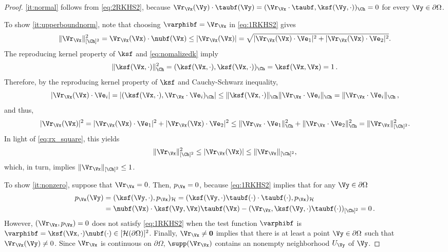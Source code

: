 \documentclass{siamart1116}
\numberwithin{theorem}{section}
\begin{document}
\begin{proof}
\cref{it:normal} follows from \cref{eq:2RKHS2}, because
$\Vr_\Vx (\Vy) \cdot \taubf(\Vy) = (\Vr_\Vx \cdot \taubf,\ksf(\Vy, \cdot))_\Ch = 0$ for every
$\Vy\in\partial\Omega$.

To show \cref{it:upperboundnorm}, note that choosing
$\varphibf = \Vr_\Vx$ in \cref{eq:1RKHS2} gives
\begin{equation}\label{eq:rx_square}
\|\Vr_\Vx\|_{[\Ch]^2}^2 = \Vr_\Vx(\Vx)\cdot \nubf(\Vx) \le |\Vr_\Vx(\Vx)| =
\sqrt{|\Vr_\Vx(\Vx)\cdot \Ve_1|^2 + |\Vr_\Vx(\Vx)\cdot \Ve_2|^2}.
\end{equation}
The reproducing kernel property of $\ksf$ and \cref{eq:nomalizedk} imply
\begin{equation}\label{eq:normkisone}
\|\ksf(\Vx,\cdot)\|_{\Ch}^2 = (\ksf(\Vx,\cdot), \ksf(\Vx,\cdot))_{\Ch} = \ksf(\Vx,\Vx) = 1\,.
\end{equation}
Therefore, by the reproducing kernel property of $\ksf$ and Cauchy-Schwarz inequality,
\begin{equation}\label{eq:rxCSineq}
|\Vr_\Vx(\Vx)\cdot \Ve_i| = |(\ksf(\Vx,\cdot),\Vr_\Vx\cdot \Ve_i)_{\Ch}| \le 
\|\ksf(\Vx,\cdot)\|_{\Ch} \|\Vr_\Vx\cdot \Ve_i\|_{\Ch} =  \|\Vr_\Vx\cdot \Ve_i\|_{\Ch}\,,
\end{equation}
and thus,
\begin{equation*} 
|\Vr_\Vx(\Vx)|^2 = |\Vr_\Vx(\Vx)\cdot \Ve_1|^2 + |\Vr_\Vx(\Vx)\cdot \Ve_2|^2
\leq  \|\Vr_\Vx\cdot \Ve_1\|_{\Ch}^2 +  \|\Vr_\Vx\cdot \Ve_2\|_{\Ch}^2 
=  \|\Vr_\Vx\|_{[\Ch]^2}^2.
\end{equation*}
In light of \cref{eq:rx_square}, this yields 
\begin{equation}\label{eq:in_light}
\begin{split}
\|\Vr_\Vx\|_{[\Ch]^2}^2   \le |\Vr_\Vx(\Vx)|
\le \|\Vr_\Vx\|_{[\Ch]^2},
\end{split}
\end{equation}
which, in turn, implies $\|\Vr_\Vx\|_{[\Ch]^2} \le 1$.

To show \cref{it:nonzero}, suppose that $\Vr_\Vx =0$. Then, $p_\Vx = 0$, because 
\cref{eq:1RKHS2} implies that for any $\Vy\in\partial\Omega$
\begin{align*}
p_\Vx(\Vy) &= (\ksf(\Vy,\cdot), p_\Vx )_{\mathcal H} 
= (\ksf(\Vy,\cdot)\taubf(\cdot) \cdot\taubf(\cdot), p_\Vx )_{\mathcal H}\\
&= \nubf(\Vx)\cdot \ksf(\Vy,\Vx)\taubf(\Vx) - (\Vr_\Vx, \ksf(\Vy,\cdot)\taubf(\cdot))_{[\Ch]^2} = 0\,.
\end{align*}
However, $(\Vr_\Vx,p_\Vx) = 0$ does not satisfy \cref{eq:1RKHS2} when the test function
$\varphibf$ is
$\varphibf=\ksf(\Vx,\cdot)\nubf(\cdot)\in[\mathcal H(\partial\Omega)]^2$.
Finally, $\Vr_\Vx\neq \mathbf{0}$ implies that
there is at least a point $\Vy\in \partial \Omega$ such that $\Vr_\Vx(\Vy)\ne 0$.
Since $\Vr_\Vx$ is continuous on $\partial \Omega$, 
 $\supp(\Vr_\Vx)$ contains an
nonempty neighborhood $U_\Vy$ of $\Vy$.  


\end{proof}
\end{document}
